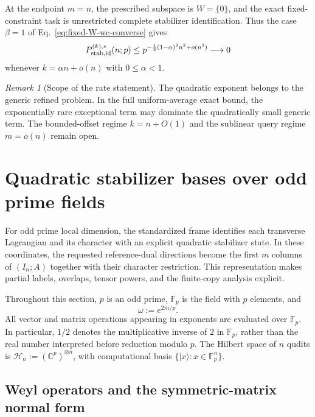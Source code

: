\documentclass[11pt]{article}
\newcommand{\F}{\mathbb F}
\newcommand{\1}{\mathbf 1}
\newcommand{\ket}[1]{\lvert #1\rangle}
\theoremstyle{plain}
\theoremstyle{definition}
\theoremstyle{remark}
\newtheorem{remark}[theorem]{Remark}
\begin{document}
At the endpoint $m=n$, the prescribed subspace is $W=\{0\}$, and the exact
fixed-constraint task is unrestricted complete stabilizer identification.
Thus the case $\beta=1$ of Eq.~\eqref{eq:fixed-W-wc-converse} gives
\begin{equation}
 P_{\rm stab,id}^{(k),*}(n;p)
 \le p^{-\frac12(1-\alpha)^2n^2+o(n^2)}\longrightarrow0
 \label{eq:unrestricted-stabilizer-converse}
\end{equation}
whenever $k=\alpha n+o(n)$ with $0\le\alpha<1$.

\begin{remark}[Scope of the rate statement]
The quadratic exponent belongs to the generic refined problem.  In the full
uniform-average exact bound, the exponentially rare exceptional term may
dominate the quadratically small generic term.  The bounded-offset regime
$k=n+O(1)$ and the sublinear query regime $m=o(n)$ remain open.
\end{remark}

\section{Quadratic stabilizer bases over odd prime fields}
\label{sec:odd-prime-foundations}

For odd prime local dimension, the standardized frame identifies each transverse Lagrangian and its character with an explicit quadratic stabilizer state.  In these coordinates,
the requested reference-dual directions become the first $m$ columns of
$(I_n;A)$ together with their character restriction.  This representation
makes partial labels, overlaps, tensor powers, and the finite-copy analysis
explicit.

Throughout this section, $p$ is an odd prime, $\F_p$ is the field with
$p$ elements, and
\begin{equation}
 \omega:=e^{2\pi i/p}.
 \label{eq:omega-definition}
\end{equation}
All vector and matrix operations appearing in exponents are evaluated over
$\F_p$.  In particular, $1/2$ denotes the multiplicative inverse of $2$ in
$\F_p$, rather than the real number interpreted before reduction modulo $p$.
The Hilbert space of $n$ qudits is
$\mathcal H_n:=(\mathbb C^p)^{\otimes n}$, with computational basis
$\{\ket{x}:x\in\F_p^n\}$.

\subsection{Weyl operators and the symmetric-matrix normal form}
\label{subsec:weyl-symmetric-matrix-normal-form}
\end{document}
